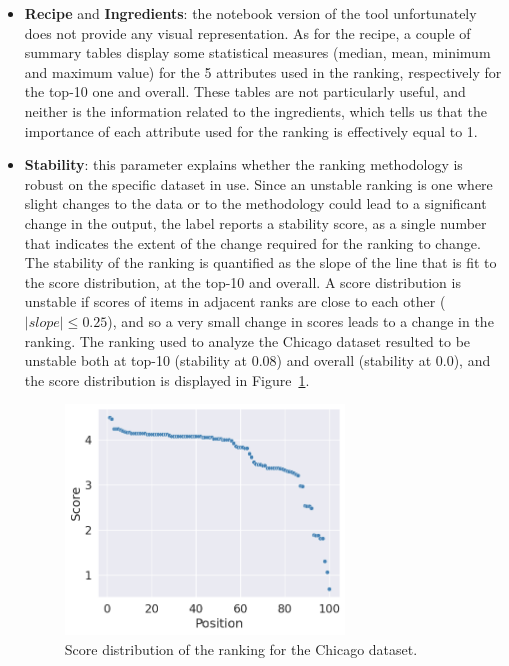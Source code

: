 \begin{itemize}
\item \textbf{Recipe} and \textbf{Ingredients}: the notebook version of the tool unfortunately does not provide any visual representation. As for the recipe, a couple of summary tables display some statistical measures (median, mean, minimum and maximum value) for the 5 attributes used in the ranking, respectively for the top-10 one and overall. These tables are not particularly useful, and neither is the information related to the ingredients, which tells us that the importance of each attribute used for the ranking is effectively equal to 1.
\item \textbf{Stability}: this parameter explains whether the ranking methodology is robust on the specific dataset in use. Since an unstable ranking is one where slight changes to the data or to the methodology could lead to a significant change in the output, the label reports a stability score, as a single number that indicates the extent of the change required for the ranking to change. The stability of the ranking is quantified as the slope of the line that is fit to the score distribution, at the top-10 and overall. A score distribution is unstable if scores of items in adjacent ranks are close to each other (\(|\mathit{slope}| \leq 0.25\)), and so a very small change in scores leads to a change in the ranking. The ranking used to analyze the Chicago dataset resulted to be unstable both at top-10 (stability at 0.08) and overall (stability at 0.0), and the score distribution is displayed in Figure~\ref{fig:chicago_rankingfacts2}.

\begin{figure}[t!]
\centering
\includegraphics[width=0.7\textwidth]{figures/chicago_rankingfacts2.png}
\caption{Score distribution of the ranking for the Chicago dataset.}
\label{fig:chicago_rankingfacts2}
\end{figure}


\end{itemize}
